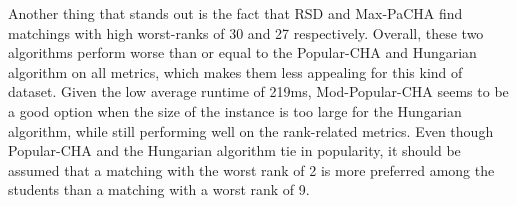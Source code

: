 \begin{table}[h!]
  \centering
  \caption{Average Results for Large Uniform Dataset with Complete Preferences.}
  \label{tab:results-uniform-large-complete}
\end{table}

Another thing that stands out is the fact that RSD and Max-PaCHA find matchings with high worst-ranks of 30 and 27 respectively. Overall, these two algorithms perform worse than or equal to the Popular-CHA and Hungarian algorithm on all metrics, which makes them less appealing for this kind of dataset. Given the low average runtime of 219ms, Mod-Popular-CHA seems to be a good option when the size of the instance is too large for the Hungarian algorithm, while still performing well on the rank-related metrics. Even though Popular-CHA and the Hungarian algorithm tie in popularity, it should be assumed that a matching with the worst rank of 2 is more preferred among the students than a matching with a worst rank of 9. 

